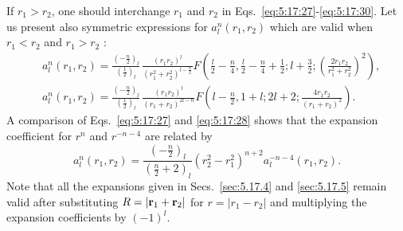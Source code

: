 If $r_{1}>r_{2}$, one should interchange $r_{1}$ and $r_{2}$ in Eqs.~\eqref{eq:5:17:27}-\eqref{eq:5:17:30}. Let us present also symmetric expressions for $a_{l}^{n}\left(r_{1}, r_{2}\right)$ which are valid when $r_{1}<r_{2}$ and $r_{1}>r_{2}$ :
\begin{align}
& a_{l}^{n}\left(r_{1}, r_{2}\right)=\frac{\left(-\frac{n}{2}\right)_{l}}{\left(\frac{1}{2}\right)_{l}} \, \frac{\left(r_{1} r_{2}\right)^{l}}{\left(r_{1}^{2}+r_{2}^{2}\right)^{l-\frac{n}{2}}} F\left(\frac{l}{2}-\frac{n}{4}, \frac{l}{2}-\frac{n}{4}+\frac{1}{2} ; l+\frac{3}{2} ;\left(\frac{2 r_{1} r_{2}}{r_{1}^{2}+r_{2}^{2}}\right)^{2}\right),  \label{eq:5:17:31}\\
& a_{l}^{n}\left(r_{1}, r_{2}\right)=\frac{\left(-\frac{n}{2}\right)_{l}}{\left(\frac{1}{2}\right)_{l}} \, \frac{\left(r_{1} r_{2}\right)^{l}}{\left(r_{1}+r_{2}\right)^{2 l-n}} F\left(l-\frac{n}{2}, 1+l ; 2 l+2 ; \frac{4 r_{1} r_{2}}{\left(r_{1}+r_{2}\right)^{2}}\right). \label{eq:5:17:32}
\end{align}
A comparison of Eqs.~\eqref{eq:5:17:27} and \eqref{eq:5:17:28} shows that the expansion coefficient for $r^{n}$ and $r^{-n-4}$ are related by
\begin{equation}
a_{l}^{n}\left(r_{1}, r_{2}\right)=\frac{\left(-\frac{n}{2}\right)_{l}}{\left(\frac{n}{2}+2\right)_{l}}\left(r_{2}^{2}-r_{1}^{2}\right)^{n+2} a_{l}^{-n-4}\left(r_{1}, r_{2}\right). \label{eq:5:17:33}
\end{equation}
Note that all the expansions given in Secs.~\ref{sec:5.17.4} and \ref{sec:5.17.5} remain valid after substituting $R=\left|\mathbf{r}_{1}+\mathbf{r}_{2}\right|$ for $r=\left|r_{1}-r_{2}\right|$ and multiplying the expansion coefficients by $(-1)^{l}$.

